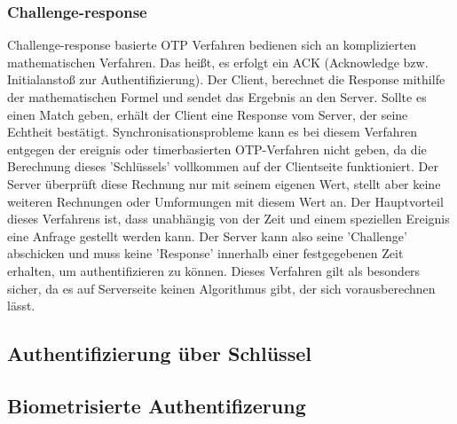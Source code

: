 \subsubsection{Challenge-response}
Challenge-response basierte OTP Verfahren bedienen sich an komplizierten mathematischen Verfahren. Das heißt, es erfolgt ein ACK (Acknowledge bzw. Initialanstoß zur Authentifizierung). Der Client, berechnet die Response mithilfe der mathematischen Formel und sendet das Ergebnis an den Server. Sollte es einen Match geben, erhält der Client eine Response vom Server, der seine Echtheit bestätigt. Synchronisationsprobleme kann es bei diesem Verfahren entgegen der ereignis oder timerbasierten OTP-Verfahren nicht geben, da die Berechnung dieses 'Schlüssels' vollkommen auf der Clientseite funktioniert. Der Server überprüft diese Rechnung nur mit seinem eigenen Wert, stellt aber keine weiteren Rechnungen oder Umformungen mit diesem Wert an. Der Hauptvorteil dieses Verfahrens ist, dass unabhängig von der Zeit und einem speziellen Ereignis eine Anfrage gestellt werden kann. Der Server kann also seine 'Challenge' abschicken und muss keine 'Response' innerhalb einer festgegebenen Zeit erhalten, um authentifizieren zu können. Dieses Verfahren gilt als besonders sicher, da es auf Serverseite keinen Algorithmus gibt, der sich vorausberechnen lässt.

\subsection{Authentifizierung über Schlüssel}
\subsection{Biometrisierte Authentifizerung}
